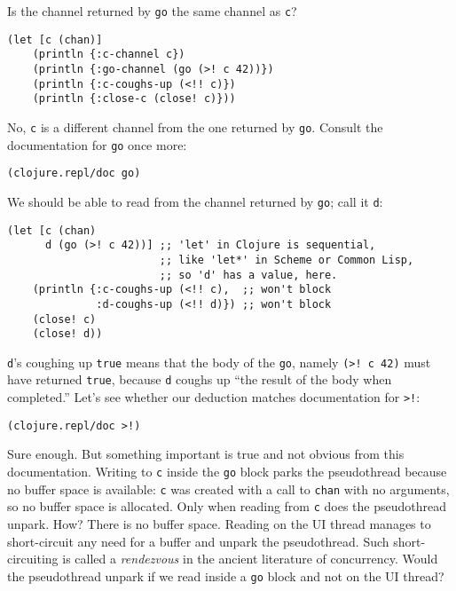\documentclass[10pt,oneside,x11names]{article}
\begin{document}
Is the channel returned by \texttt{go} the same channel as \texttt{c}?

\begin{verbatim}
(let [c (chan)]
    (println {:c-channel c})
    (println {:go-channel (go (>! c 42))})
    (println {:c-coughs-up (<!! c)})
    (println {:close-c (close! c)}))
\end{verbatim}

No, \texttt{c} is a different channel from the one returned by \texttt{go}. Consult
the documentation for \texttt{go} once more:

\begin{verbatim}
(clojure.repl/doc go)
\end{verbatim}

We should be able to read from the channel returned by \texttt{go}; call it
\texttt{d}:

\begin{verbatim}
(let [c (chan)
      d (go (>! c 42))] ;; 'let' in Clojure is sequential,
                        ;; like 'let*' in Scheme or Common Lisp,
                        ;; so 'd' has a value, here.
    (println {:c-coughs-up (<!! c),  ;; won't block
              :d-coughs-up (<!! d)}) ;; won't block
    (close! c)
    (close! d))
\end{verbatim}

\texttt{d}'s coughing up \texttt{true} means that the body of the \texttt{go}, namely
\texttt{(>! c 42)} must have returned \texttt{true}, because \texttt{d} coughs up ``the result
of the body when completed.'' Let's see whether our deduction matches
documentation for \texttt{>!}:

\begin{verbatim}
(clojure.repl/doc >!)
\end{verbatim}

Sure enough. But something important is true and not obvious from this
documentation. Writing to \texttt{c} inside the \texttt{go} block parks the
pseudothread because no buffer space is available: \texttt{c} was created with
a call to \texttt{chan} with no arguments, so no buffer space is allocated.
Only when reading from \texttt{c} does the pseudothread unpark. How? There is
no buffer space. Reading on the UI thread manages to short-circuit any
need for a buffer and unpark the pseudothread. Such short-circuiting is
called a \emph{rendezvous} in the ancient literature of concurrency. Would
the pseudothread unpark if we read inside a \texttt{go} block and not on the UI
thread?
\end{document}
